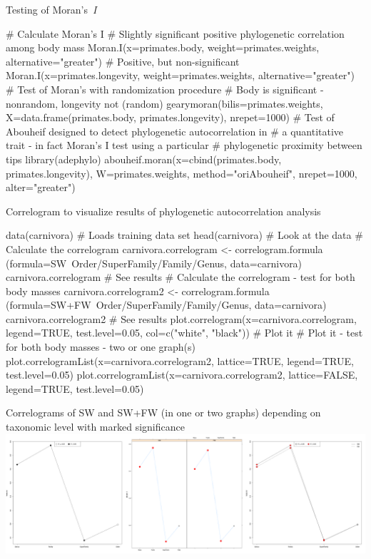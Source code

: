\documentclass[compress, ucs, xelatex, 11pt, xcolor=svgnames,
	hyperref={
		bookmarks=true,
		unicode=true,
		colorlinks=true,
		pdftitle={Molecular data in R},
		plainpages=false,
		pdfauthor={Vojtech Zeisek},
		pdfsubject={Course about phylogeny and evolution in R},
		pdfcreator={XeLaTeX},
		pdfkeywords={R, evolution, phylogeny, molecular data},
		linkcolor=Tomato,
		anchorcolor=SaddleBrown,
		citecolor=Goldenrod,
		filecolor=DarkMagenta,
		menucolor=Sienna,
		urlcolor=DarkTurquoise,
		pdftex},
	url={hyphens, lowtilde} %
	]{beamer}
\begin{document}
\begin{frame}[fragile]{Testing of Moran's~\textit{I}}
	\begin{spluscode}
    # Calculate Moran's I
    # Slightly significant positive phylogenetic correlation among body mass
    Moran.I(x=primates.body, weight=primates.weights,
      alternative="greater")
    # Positive, but non-significant
    Moran.I(x=primates.longevity, weight=primates.weights,
      alternative="greater")
    # Test of Moran's with randomization procedure
    # Body is significant - nonrandom, longevity not (random)
    gearymoran(bilis=primates.weights, X=data.frame(primates.body,
      primates.longevity), nrepet=1000)
    # Test of Abouheif designed to detect phylogenetic autocorrelation in
    # a quantitative trait - in fact Moran's I test using a particular
    # phylogenetic proximity between tips
    library(adephylo)
    abouheif.moran(x=cbind(primates.body, primates.longevity),
      W=primates.weights, method="oriAbouheif", nrepet=1000,
      alter="greater")
	\end{spluscode}
\end{frame}

\begin{frame}[fragile]{Correlogram to visualize results of phylogenetic autocorrelation analysis}
	\begin{spluscode}
    data(carnivora) # Loads training data set
    head(carnivora) # Look at the data
    # Calculate the correlogram
    carnivora.correlogram <- correlogram.formula
      (formula=SW~Order/SuperFamily/Family/Genus, data=carnivora)
    carnivora.correlogram # See results
    # Calculate the correlogram - test for both body masses
    carnivora.correlogram2 <- correlogram.formula
      (formula=SW+FW~Order/SuperFamily/Family/Genus, data=carnivora)
    carnivora.correlogram2 # See results
    plot.correlogram(x=carnivora.correlogram, legend=TRUE,
      test.level=0.05, col=c("white", "black")) # Plot it
    # Plot it - test for both body masses - two or one graph(s)
    plot.correlogramList(x=carnivora.correlogram2, lattice=TRUE,
      legend=TRUE, test.level=0.05)
    plot.correlogramList(x=carnivora.correlogram2, lattice=FALSE,
      legend=TRUE, test.level=0.05)
	\end{spluscode}
\end{frame}

\begin{frame}{Correlograms of SW and SW+FW (in one or two graphs) depending on taxonomic level with marked significance}
	\includegraphics[width=\textwidth]{correlog.png}
\end{frame}
\end{document}
